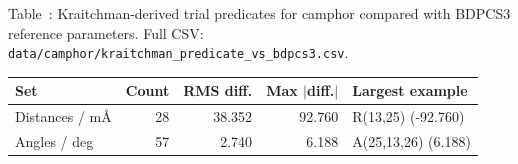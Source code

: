 \begin{center}
\label{tab:si-camphor-kraitchman}
\parbox{0.94\linewidth}{\small\raggedright Table~\thetable: Kraitchman-derived trial predicates for camphor compared with BDPCS3 reference parameters. Full CSV: \texttt{data/camphor/kraitchman\_predicate\_vs\_bdpcs3.csv}.\par}
\smallskip
\footnotesize
\begin{tabular}{lrrrl}
\toprule
Set & Count & RMS diff. & Max $|$diff.$|$ & Largest example \\
\midrule
Distances / m\AA{} & 28 & 38.352 & 92.760 & R(13,25) (-92.760) \\
Angles / deg & 57 & 2.740 & 6.188 & A(25,13,26) (6.188) \\
\bottomrule
\end{tabular}
\end{center}
